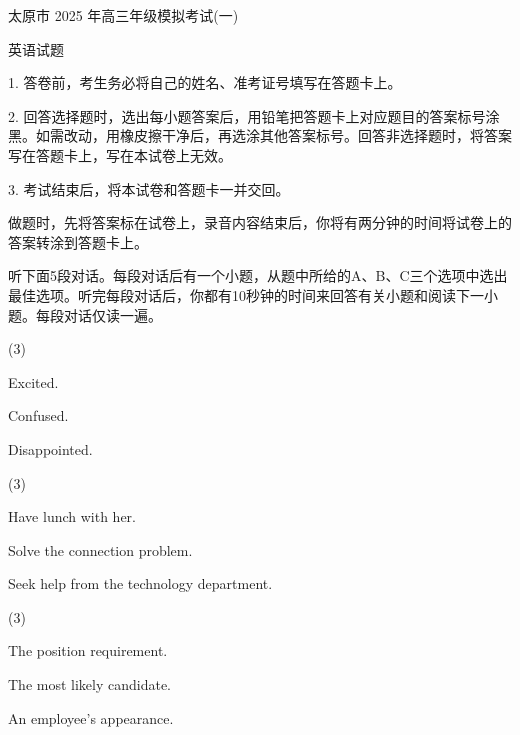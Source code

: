 \documentclass{英语试卷}
\begin{document}
\par 太原市 2025 年高三年级模拟考试(一)\par
\par 英语试题\par
\begin{notice}
\par 1. 答卷前，考生务必将自己的姓名、准考证号填写在答题卡上。\par
\par 2. 回答选择题时，选出每小题答案后，用铅笔把答题卡上对应题目的答案标号涂黑。如需改动，用橡皮擦干净后，再选涂其他答案标号。回答非选择题时，将答案写在答题卡上，写在本试卷上无效。\par
\par 3. 考试结束后，将本试卷和答题卡一并交回。\par
\end{notice}
\par 做题时，先将答案标在试卷上，录音内容结束后，你将有两分钟的时间将试卷上的答案转涂到答题卡上。\par
{}
\par 听下面5段对话。每段对话后有一个小题，从题中所给的A、B、C三个选项中选出最佳选项。听完每段对话后，你都有10秒钟的时间来回答有关小题和阅读下一小题。每段对话仅读一遍。\par
{}
\begin{choices}(3)
  \item Excited.
  \item Confused.
  \item Disappointed.
\end{choices}
\begin{choices}(3)
  \item Have lunch with her.
  \item Solve the connection problem.
  \item Seek help from the technology department.
\end{choices}
\begin{choices}(3)
  \item The position requirement.
  \item The most likely candidate.
  \item An employee's appearance.
\end{choices}
\end{document}
